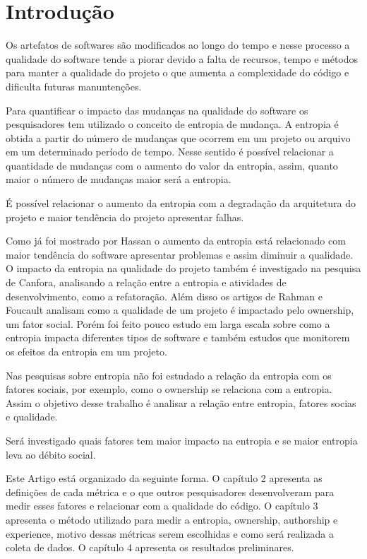 \chapter{Introdução}

Os artefatos de softwares são modificados ao longo do tempo e nesse processo a qualidade do software tende a piorar devido a falta de recursos, tempo e métodos para manter a qualidade do projeto o que aumenta a complexidade do código e dificulta futuras manuntenções.

Para quantificar o impacto das mudanças na qualidade do software os pesquisadores tem utilizado o conceito de entropia de mudança. A entropia é obtida a partir do número de mudanças que ocorrem em um projeto ou arquivo em um determinado período de tempo. Nesse sentido é possível relacionar a quantidade de mudanças com o aumento do valor da entropia, assim, quanto maior o número de mudanças maior será a entropia.

É possível relacionar o aumento da entropia com a degradação da arquitetura do projeto e maior tendência do projeto apresentar falhas.

Como já foi mostrado por Hassan\cite{Hassan:2009:PFU:1555001.1555024} o aumento da entropia está relacionado com maior tendência do software apresentar problemas e assim diminuir a qualidade. O impacto da entropia na qualidade do projeto também é investigado na pesquisa de Canfora, analisando a relação entre a entropia e atividades de desenvolvimento, como a refatoração. Além disso os artigos de Rahman\cite{Rahman2011} e Foucault\cite{Foucault2015} analisam como a qualidade de um projeto é impactado pelo ownership, um fator social. Porém foi feito pouco estudo em larga escala sobre como a entropia impacta diferentes tipos de software e também estudos que monitorem os efeitos da entropia em um projeto.

Nas pesquisas sobre entropia não foi estudado a relação da entropia com os fatores sociais, por exemplo, como o ownership se relaciona com a entropia. Assim o objetivo desse trabalho é analisar a relação entre entropia, fatores socias e qualidade.

Será investigado quais fatores tem maior impacto na entropia e se maior entropia leva ao débito social.

Este Artigo está organizado da seguinte forma. O capítulo 2 apresenta as definições de cada métrica e o que outros pesquisadores desenvolveram para medir esses fatores e relacionar com a qualidade do código. O capítulo 3 apresenta o método utilizado para medir a entropia, ownership, authorship e experience, motivo dessas métricas serem escolhidas e como será realizada a coleta de dados. O capítulo 4 apresenta os resultados preliminares.